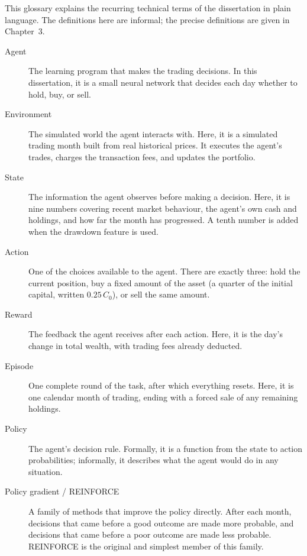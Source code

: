 
This glossary explains the recurring technical terms of the dissertation
in plain language. The definitions here are informal; the precise
definitions are given in Chapter~3.

\begin{description}

  \item[Agent] The learning program that makes the trading decisions. In
  this dissertation, it is a small neural network that decides each day
  whether to hold, buy, or sell.

  \item[Environment] The simulated world the agent interacts with. Here,
  it is a simulated trading month built from real historical prices. It
  executes the agent's trades, charges the transaction fees, and updates
  the portfolio.

  \item[State] The information the agent observes before making a
  decision. Here, it is nine numbers covering recent market behaviour,
  the agent's own cash and holdings, and how far the month has
  progressed. A tenth number is added when the drawdown feature is used.

  \item[Action] One of the choices available to the agent. There are
  exactly three: hold the current position, buy a fixed amount of the
  asset (a quarter of the initial capital, written \(0.25\,C_0\)), or
  sell the same amount.

  \item[Reward] The feedback the agent receives after each action. Here,
  it is the day's change in total wealth, with trading fees already
  deducted.

  \item[Episode] One complete round of the task, after which everything
  resets. Here, it is one calendar month of trading, ending with a forced
  sale of any remaining holdings.

  \item[Policy] The agent's decision rule. Formally, it is a function
  from the state to action probabilities; informally, it describes what
  the agent would do in any situation.

  \item[Policy gradient / REINFORCE] A family of methods that improve
  the policy directly. After each month, decisions that came before a
  good outcome are made more probable, and decisions that came before a
  poor outcome are made less probable. REINFORCE is the original and
  simplest member of this family.


\end{description}
